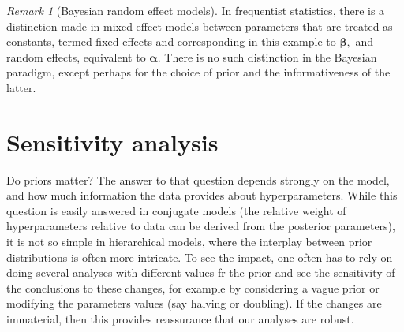 \documentclass[
  11pt,
  letterpaper,
]{scrbook}
\theoremstyle{definition}
\theoremstyle{plain}
\theoremstyle{plain}
\theoremstyle{plain}
\theoremstyle{definition}
\theoremstyle{definition}
\theoremstyle{plain}
\theoremstyle{plain}
\theoremstyle{remark}
\newtheorem{refremark}{Remark}[chapter]
\begin{document}
\begin{refremark}[Bayesian random effect models]
In frequentist statistics, there is a distinction made in mixed-effect
models between parameters that are treated as constants, termed fixed
effects and corresponding in this example to \(\boldsymbol{\beta},\) and
random effects, equivalent to \(\boldsymbol{\alpha}.\) There is no such
distinction in the Bayesian paradigm, except perhaps for the choice of
prior and the informativeness of the latter.

\label{rem-remark-mixed}

\end{refremark}

\section{Sensitivity analysis}\label{sensitivity-analysis}

Do priors matter? The answer to that question depends strongly on the
model, and how much information the data provides about hyperparameters.
While this question is easily answered in conjugate models (the relative
weight of hyperparameters relative to data can be derived from the
posterior parameters), it is not so simple in hierarchical models, where
the interplay between prior distributions is often more intricate. To
see the impact, one often has to rely on doing several analyses with
different values fr the prior and see the sensitivity of the conclusions
to these changes, for example by considering a vague prior or modifying
the parameters values (say halving or doubling). If the changes are
immaterial, then this provides reassurance that our analyses are robust.
\end{document}
